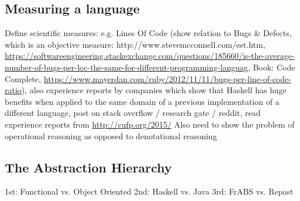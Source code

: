 \subsection{Measuring a language}
Define scientific measures: e.g. Lines Of Code (show relation to Bugs \& Defects, which is an objective measure: http://www.stevemcconnell.com/est.htm, \url{https://softwareengineering.stackexchange.com/questions/185660/is-the-average-number-of-bugs-per-loc-the-same-for-different-programming-languag}, Book: Code Complete, \url{https://www.mayerdan.com/ruby/2012/11/11/bugs-per-line-of-code-ratio}), also experience reports by companies which show that Haskell has huge benefits when applied to the same domain of a previous implementation of a different language, post on stack overflow / research gate / reddit, read experience reports from \url{http://cufp.org/2015/} Also need to show the problem of operational reasoning as opposed to denotational reasoning

\subsection{The Abstraction Hierarchy}

1st: Functional vs. Object Oriented
2nd: Haskell vs. Java
3rd: FrABS vs. Repast
